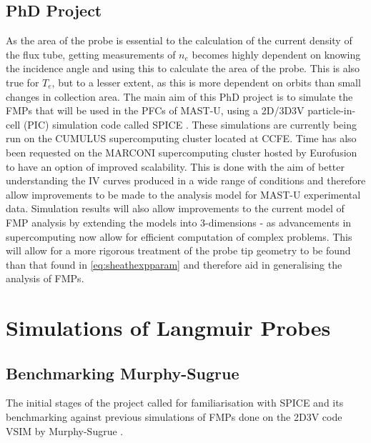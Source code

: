 \documentclass[a4paper, 11pt]{article} %
\begin{document}
\subsection{\label{subsec:motivation}PhD Project}
	As the area of the probe is essential to the calculation of the current density of the flux tube, getting measurements of $n_e$ becomes highly dependent on knowing the incidence angle and using this to calculate the area of the probe.
	This is also true for $T_e$, but to a lesser extent, as this is more dependent on orbits than small changes in collection area. 
	The main aim of this PhD project is to simulate the FMPs that will be used in the PFCs of MAST-U, using a 2D/3D3V particle-in-cell (PIC) simulation code called SPICE \cite{Komm2011, Komm2013}. 
	These simulations are currently being run on the CUMULUS supercomputing cluster located at CCFE.
	Time has also been requested on the MARCONI supercomputing cluster hosted by Eurofusion\cite{Voitsekhovitch2018} to have an option of improved scalability.
	This is done with the aim of better understanding the IV curves produced in a wide range of conditions and therefore allow improvements to be made to the analysis model for MAST-U experimental data.
	Simulation results will also allow improvements to the current model of FMP analysis by extending the models into 3-dimensions - as advancements in supercomputing now allow for efficient computation of complex problems.
	This will allow for a more rigorous treatment of the probe tip geometry to be found than that found in \cref{eq:sheathexpparam} and therefore aid in generalising the analysis of FMPs.


\section{\label{sec:lpsims}Simulations of Langmuir Probes}
	
\subsection{\label{subsec:benchmark}Benchmarking Murphy-Sugrue}
	The initial stages of the project called for familiarisation with SPICE and its benchmarking against previous simulations of FMPs done on the 2D3V code VSIM by Murphy-Sugrue \cite{Murphy-Sugrue2017a}.
	
\end{document}
